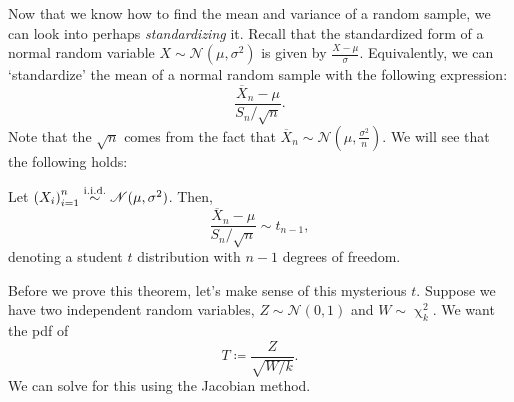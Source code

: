 Now that we know how to find the mean and variance of a random sample, we can look into perhaps \textit{standardizing} it. 
Recall that the standardized form of a normal random variable \(X\sim\mathscr{N}(\mu, \sigma^2)\) is given by \(\frac{X-\mu}{\sigma}\). 
Equivalently, we can `standardize' the mean of a normal random sample with the following expression:\[
    \frac{\overline{X}_n -\mu}{S_n/\sqrt{n}}. 
\]Note that the \(\sqrt{n}\) comes from the fact that \(\overline{X}_n\sim \mathscr{N}(\mu, \frac{\sigma^2}{n})\).
We will see that the following holds:

\begin{theorem}
    Let \({(X_i)}_{i=1}^n \stackrel{\mathrm{i.i.d.}}{\sim} \mathscr{N}(\mu, \sigma^2)\). Then,\[
        \frac{\overline{X}_n -\mu}{S_n/\sqrt{n}}\sim t_{n-1},
    \]denoting a student \(t\) distribution with \(n-1\) degrees of freedom. 
\end{theorem}

Before we prove this theorem, let's make sense of this mysterious \(t\). 
Suppose we have two independent random variables, \(Z\sim \mathscr{N}(0,1)\) and \(W\sim \upchi_k^2\). 
We want the pdf of\[
T \coloneq \frac{Z}{\sqrt{W/k}}. 
\]We can solve for this using the Jacobian method. 

